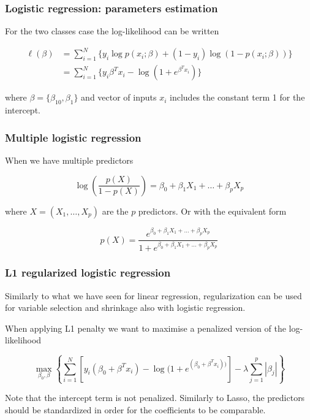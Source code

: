 \documentclass[notes]{beamer}          %
\begin{document}
\begin{frame}
\frametitle{Logistic regression: parameters estimation}

For the two classes case the log-likelihood can be written

\begin{align*}
    \ell(\beta) &= \sum_{i=1}^N \{ y_i \log p(x_i;\beta) + (1-y_i) \log (1-p(x_i;\beta)) \} \\
    &= \sum_{i=1}^N \{ y_i \beta^T x_i - \log (1+e^{\beta^T x_i}) \}
\end{align*}

where $\beta=\{ \beta_{10}, \beta_1\}$ and vector of inputs $x_i$ includes the constant term 1 for the intercept.


\end{frame}

\begin{frame}
\frametitle{Multiple logistic regression}

When we have multiple predictors

\begin{equation*}
    \log \left( \frac{p(X)}{1-p(X)} \right) = \beta_0 + \beta_1 X_1 + \dots + \beta_p X_p 
\end{equation*}

where $X=(X_1, \dots, X_p)$ are the $p$ predictors. Or with the equivalent form

\begin{equation*}
    p(X) = \frac{e^{\beta_0 + \beta_1 X_1 + \dots + \beta_p X_p}}{1+e^{\beta_0 + \beta_1 X_1 + \dots + \beta_p X_p}}
\end{equation*}


\end{frame}

\begin{frame}
\frametitle{L1 regularized logistic regression}

Similarly to what we have seen for linear regression, regularization can be used for variable selection and shrinkage also with logistic regression.

\vspace{5mm} 

When applying L1 penalty we want to maximise a penalized version of the log-likelihood

\begin{equation*}
    \max_{\beta_0, \beta} \left\{ \sum_{i=1}^N [ y_i(\beta_0 + \beta^T x_i) - \log (1+e^{(\beta_0 + \beta^T x_i))}] -\lambda \sum_{j=1}^p | \beta_j| \right\}
\end{equation*}

Note that the intercept term is not penalized. Similarly to Lasso, the predictors should be standardized in order for the coefficients to be comparable.

\end{frame}
\end{document}
